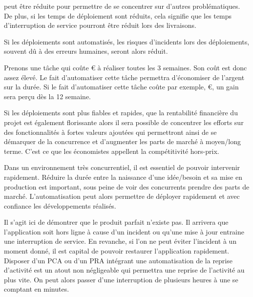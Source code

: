 \begin{description}
	\setlength\itemsep{0em}
	\item [La durée de de déploiement] peut être réduite pour permettre de se concentrer sur d'autres problématiques. De plus, si les temps de déploiement sont réduits, cela signifie que les temps d'interruption de service pourront être réduit lors des livraisons.
	\item [Erreur de déploiement] Si les déploiements sont automatisés, les risques d'incidents lors des déploiements, souvent dû à des erreurs humaines, seront alors réduit.
	\item [Rentabilité financière] Prenons une tâche qui coûte € à réaliser toutes les 3 semaines. Son coût est donc assez élevé. Le fait d'automatiser cette tâche permettra d'économiser de l'argent sur la durée. Si le fait d'automatiser cette tâche coûte par exemple, €, un gain sera perçu dès la 12 semaine.\label{ref-rentabilite-finance}
	\item [Part de marché] Si les déploiements sont plus fiables et rapides, que la rentabilité financière du projet est également florissante alors il sera possible de concentrer les efforts sur des fonctionnalités à fortes valeurs ajoutées qui permettront ainsi de se démarquer de la concurrence et d'augmenter les parts de marché à moyen/long terme. C'est ce que les économistes appellent la compétitivité hors-prix.
	\item [\Gls{timetomarket}] Dans un environnement très concurrentiel, il est essentiel de pouvoir intervenir rapidement. Réduire la durée entre la naissance d'une idée/besoin et sa mise en production est important, sous peine de voir des concurrents prendre des parts de marché. L'automatisation peut alors permettre de déployer rapidement et avec confiance les développements réalisés.
	\item [Reprise d'activité] Il s'agit ici de démontrer que le produit parfait n'existe pas. Il arrivera que l'application soit hors ligne à cause d'un incident ou qu'une mise à jour entraine une interruption de service. En revanche, si l'on ne peut éviter l'incident à un moment donné, il est capital de pouvoir restaurer l'application rapidement. Disposer d'un \gls{PCA} ou d'un \gls{PRA} intégrant une automatisation de la reprise d'activité est un atout non négligeable qui permettra une reprise de l'activité au plus vite. On peut alors passer d'une interruption de plusieurs heures à une se comptant en minutes.\label{ref-pra}
\end{description}

